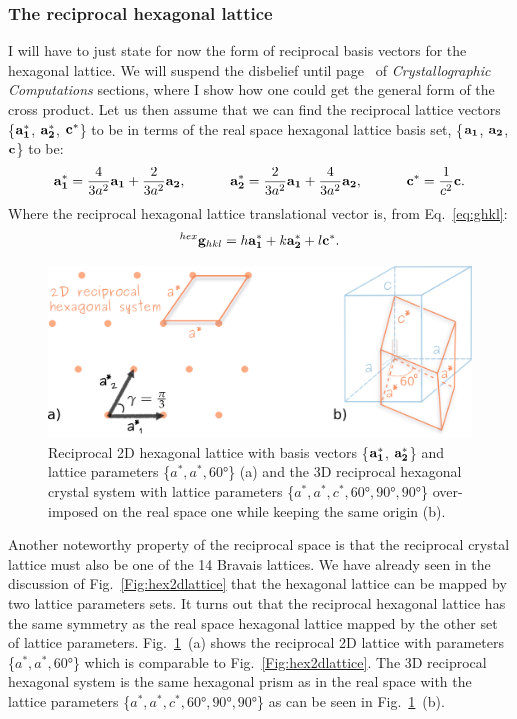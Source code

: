 \subsubsection{The reciprocal hexagonal lattice}
\label{sec:recHex}
I will have to just state for now the form of reciprocal basis vectors for the hexagonal lattice. We will suspend the disbelief until page~\pageref{sec:crossProd} of \textit{Crystallographic Computations} sections, where I show how one could get the general form of the cross product.  Let us then assume that we can find the reciprocal lattice vectors \{$\vb{a^*_1}$, $\vb{a^*_2}$, $\vb{c^*}$\} to be in terms of the real space hexagonal lattice basis set, \{$\vb{a_1}$, $\vb{a_2}$, $\vb{c}$\} to be: 
\begin{equation}
\label{eq:3recvectors}
\vb{a^*_1}  = \frac{4}{3a^2} \vb{a_1} + \frac{2}{3a^2} \vb{a_2} ,\,\quad\quad\quad %
\vb{a^*_2}  = \frac{2}{3a^2} \vb{a_1} + \frac{4}{3a^2} \vb{a_2} ,\,\quad\quad\quad  %
\vb{c}^*  = \frac{1}{c^2} \vb{c}.
\end{equation}
Where the reciprocal hexagonal lattice translational vector is, from Eq.~\ref{eq:ghkl}:
\begin{equation}
^{hex}\vb{g}_{hkl} = h\vb{a^*_1}+k\vb{a^*_2}+l\vb{c^*}.
\end{equation}


\begin{figure}[htb]
    \centering
\includegraphics[width=.8\linewidth]{Figures/recHex.png}
\caption[Reciprocal 2D hexagonal lattice.]{Reciprocal 2D hexagonal lattice with basis vectors \{$\vb{a^*_1}$, $\vb{a^*_2}$\} and lattice parameters \{$a^*, a^*, 60\si{\degree}$\} (a) and the 3D reciprocal hexagonal crystal system with lattice parameters \{$a^*, a^*, c^*, 60\si{\degree}, 90\si{\degree}, 90\si{\degree}$\} over-imposed on the real space one while keeping the same origin (b).}
\label{Fig:recHex}
\end{figure}

Another noteworthy property of the reciprocal space is that the reciprocal crystal lattice must also be one of the 14 Bravais lattices. We have already seen in the discussion of Fig.~\ref{Fig:hex2dlattice} that the hexagonal lattice can be mapped by two lattice parameters sets. It turns out that the reciprocal hexagonal lattice has the same symmetry as the real space hexagonal lattice mapped by the other set of lattice parameters. Fig.~\ref{Fig:recHex}~(a) shows the reciprocal 2D lattice with parameters \{$a^*, a^*, 60\si{\degree}$\} which is comparable to Fig.~\ref{Fig:hex2dlattice}. The 3D reciprocal hexagonal system is the same hexagonal prism as in the real space with the lattice parameters \{$a^*, a^*, c^*, 60\si{\degree}, 90\si{\degree}, 90\si{\degree}$\} as can be seen in Fig.~\ref{Fig:recHex}~(b).



